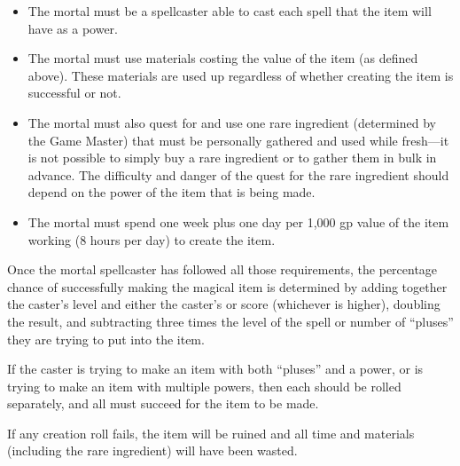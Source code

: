 \begin{multicols*}{2}
\begin{itemize}
 \item{The mortal must be a spellcaster able to cast each spell that the item will have as a power.}
 \item{The mortal must use materials costing the value of the item (as defined above). These materials are used up regardless of whether creating the item is successful or not.}
 \item{The mortal must also quest for and use one rare ingredient (determined by the Game Master) that must be personally gathered and used while fresh—it is not possible to simply buy a rare ingredient or to gather them in bulk in advance. The difficulty and danger of the quest for the rare ingredient should depend on the power of the item that is being made.}
 \item{The mortal must spend one week plus one day per 1,000 gp value of the item working (8 hours per day) to create the item.}
\end{itemize}

Once the mortal spellcaster has followed all those requirements, the percentage chance of successfully making the magical item is determined by adding together the caster’s level and either the caster’s  or  score (whichever is higher), doubling the result, and subtracting three times the level of the spell or number of “pluses” they are trying to put into the item.

If the caster is trying to make an item with both “pluses” and a power, or is trying to make an item with multiple powers, then each should be rolled separately, and all must succeed for the item to be made.

If any creation roll fails, the item will be ruined and all time and materials (including the rare ingredient) will have been wasted.

\end{multicols*}
